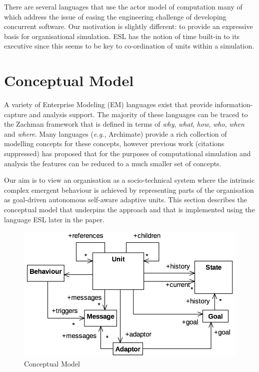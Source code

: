 \documentclass[10pt,numbers]{sigplanconf}
\begin{document}
There are several languages that use the actor model of computation \cite{ricci2015special} many of which address the issue of easing the engineering challenge of developing concurrent software. Our motivation is slightly different: to provide an expressive basis for organisational simulation. ESL has the notion of time built-in to its executive since this seems to be key to co-ordination of units within a simulation.

\section{Conceptual Model}

\label{sec:concepts}

A variety of Enterprise Modeling (EM) languages exist that provide information-capture and analysis support. The majority of these languages can be traced to the Zachman framework that is defined in terms of {\it why}, {\it what}, {\it how}, {\it who}, {\it when} and {\it where}. Many languages ({\it e.g.}, Archimate) provide a rich collection of modelling concepts for these concepts, however previous work (citations suppressed) has proposed that for the purposes of computational simulation and analysis the features can be reduced to a much smaller set of concepts.

Our aim is to view an organisation as a socio-technical system where the intrinsic complex emergent behaviour is achieved by representing parts of the organisation as goal-driven autonomous self-aware adaptive units. This section describes the conceptual model that underpins the approach and that is implemented using the language ESL later in the paper.

\begin{figure}[t]
\includegraphics[width=\columnwidth]{unit}
\caption{Conceptual Model}
\label{fig:conceptual_model}
\end{figure}
\end{document}
